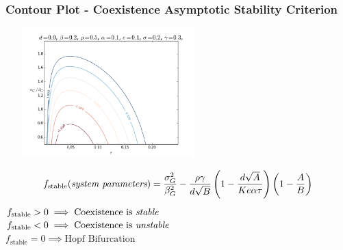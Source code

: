 \documentclass[10pt]{beamer}
\begin{document}

\begin{frame}
	\frametitle{Contour Plot - Coexistence Asymptotic Stability Criterion}
	\vspace{-5pt}
	\begin{center}
		\includegraphics[width=8cm, height=5cm]{figures/1x1/variable_growth/contour_plots/tau_ratio_150417_125636.png} \\
	\end{center}
	\vspace{-10pt}
	\begin{align*}
		f_{\text{stable}}(\text{\it system parameters}) = \dfrac{\sigma_G^2}{\beta_G^2} -\dfrac{\rho\gamma}{d\sqrt{B}}\left(1 - \dfrac{d\sqrt{A}}{Ke\alpha\tau}\right)\left(1 - \dfrac{A}{B}\right)
	\end{align*}
	$f_{\text{stable}} > 0 \implies \text{Coexistence is \it stable}$ \\
	$f_{\text{stable}} < 0 \implies \text{Coexistence is \it unstable}$ \\
	$f_{\text{stable}} = 0 \implies \text{Hopf Bifurcation}$
\end{frame}
\end{document}
